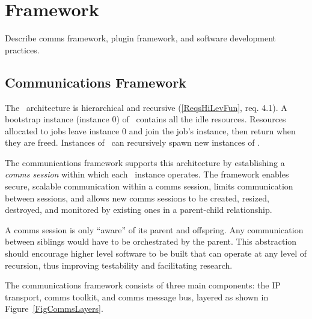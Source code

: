 \section{Framework}

Describe comms framework, plugin framework, and software
development practices.

\subsection{Communications Framework}

The \ngrm\ architecture is hierarchical and recursive
(\ref{ReqsHiLevFun}, req. 4.1).
A bootstrap instance (instance 0) of \ngrm\ contains all the
idle resources.  Resources allocated to jobs leave instance 0
and join the job's instance, then return when they are freed.
Instances of \ngrm\ can recursively spawn new instances of \ngrm.

The communications framework supports this architecture by
establishing a {\em comms session} within which each \ngrm\ instance
operates.  The framework enables secure, scalable communication
within a comms session, limits communication between sessions,
and allows new comms sessions to be created, resized, destroyed,
and monitored by existing ones in a parent-child relationship.

A comms session is only ``aware'' of its parent and offspring.
Any communication between siblings would have to be orchestrated by
the parent.  This abstraction should encourage higher level software
to be built that can operate at any level of recursion, thus improving
testability and facilitating research.

The communications framework consists of three main components:
the IP transport, comms toolkit, and comms message bus, layered
as shown in Figure~\ref{FigCommsLayers}.

